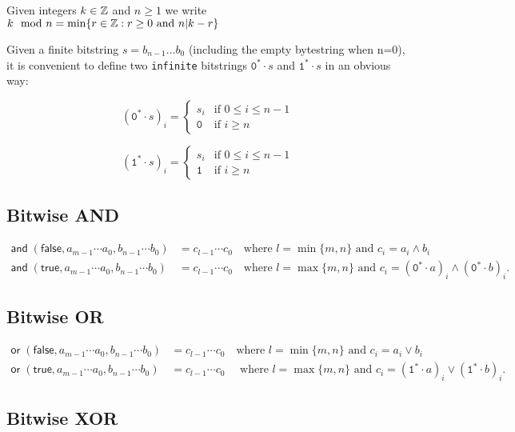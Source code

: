 \noindent Given integers $k \in \mathbb{Z}$ and $n \geq 1$ we write $k \mod n = \min\{r \in \mathbb{Z}: r \geq 0 \text{ and } n | k - r \}$

\newcommand{\extzero}[1]{\mathtt{0}^*{\cdot}#1}
\newcommand{\extone}[1]{\mathtt{1}^*{\cdot}#1}

Given a finite bitstring $s=b_{n-1} \ldots b_0$ (including the empty bytestring
when n=0), it is convenient to define two
\texttt{infinite} bitstrings $\extzero{s}$ and $\extone{s}$ in an obvious way:

$$
(\extzero{s})_i =
\begin{cases}
  s_i & \text{if $0 \leq i \leq n-1$}\\
  \mathtt{0} & \text{if $i \geq n$}
\end{cases}
$$

$$
(\extone{s})_i =
\begin{cases}
  s_i & \text{if $0 \leq i \leq n-1$}\\
  \mathtt{1} & \text{if $i \geq n$}
\end{cases}
$$



\subsection{Bitwise AND}
\begin{align*}
\mathsf{and}\;(\mathsf{false}, a_{m-1} \cdots a_0, b_{n-1} \cdots b_0) &= c_{l-1} \cdots c_0 
\quad \text{where $l=\min\{m,n\}$ and $c_i = a_i \wedge b_i$}\\
\mathsf{and}\;(\mathsf{true}, a_{m-1} \cdots a_0, b_{n-1} \cdots b_0) &= c_{l-1} \cdots c_0
\quad \text{where $l=\max\{m,n\}$ and $c_i = (\extzero{a})_i \wedge(\extzero{b})_i$.}
\end{align*}


\subsection{Bitwise OR}
\begin{align*}
\mathsf{or}\;(\mathsf{false}, a_{m-1} \cdots a_0, b_{n-1} \cdots b_0) &= c_{l-1} \cdots c_0
  \quad \text{where $l=\min\{m,n\}$ and $c_i = a_i \vee b_i$}\\
\mathsf{or}\;(\mathsf{true}, a_{m-1} \cdots a_0, b_{n-1} \cdots b_0) &= c_{l-1} \cdots c_0 
\quad \text{ where $l=\max\{m,n\}$ and $c_i = (\extone{a})_i \vee (\extone{b})_i$.}
\end{align*}


\subsection{Bitwise XOR}

